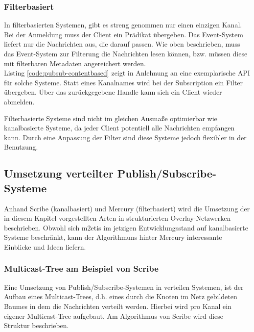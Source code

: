 \subsubsection{Filterbasiert}
\label{chap:grundlagen:pubsub:filterbased}
In filterbasierten Systemen, gibt es streng genommen nur einen einzigen Kanal. Bei der Anmeldung muss der Client ein Prädikat übergeben. Das Event-System liefert nur die Nachrichten aus, die darauf passen. Wie oben beschrieben, muss das Event-System zur Filterung die Nachrichten lesen können, bzw. müssen diese mit filterbaren Metadaten angereichert werden.\\
Listing \ref{code:pubsub-contentbased} zeigt in Anlehnung an \cite{PiEyKoSh2007-PubSubAPI} eine exemplarische API für solche Systeme. Statt eines Kanalnames wird bei der Subscription ein Filter übergeben. Über das zurückgegebene Handle kann sich ein Client wieder abmelden.

Filterbasierte Systeme sind nicht im gleichen Ausmaße optimierbar wie kanalbasierte Systeme, da jeder Client potentiell alle Nachrichten empfangen kann. Durch eine Anpassung der Filter sind diese Systeme jedoch flexibler in der Benutzung.




\subsection{Umsetzung verteilter Publish/Subscribe-Systeme}
Anhand Scribe (kanalbasiert) \cite{Castro2002Scribe} und Mercury (filterbasiert) \cite{Bharambe2004Mercury} wird die Umsetzung der in diesem Kapitel vorgestellten Arten in strukturierten Overlay-Netzwerken beschrieben. Obwohl sich \ac{m2etis} im jetzigen Entwicklungsstand auf kanalbasierte Systeme beschränkt, kann der Algorithmuns hinter Mercury interessante Einblicke und Ideen liefern.

\subsubsection*{Multicast-Tree am Beispiel von Scribe}
\label{chap:related:scribe}
Eine Umsetzung von Publish/Subscribe-Systemen in verteilen Systemen, ist der Aufbau eines Multicast-Trees, d.h. eines durch die Knoten im Netz gebildeten Baumes in dem die Nachrichten verteilt werden. Hierbei wird pro Kanal ein eigener Multicast-Tree aufgebaut. Am Algorithmus von Scribe wird diese Struktur beschrieben.

